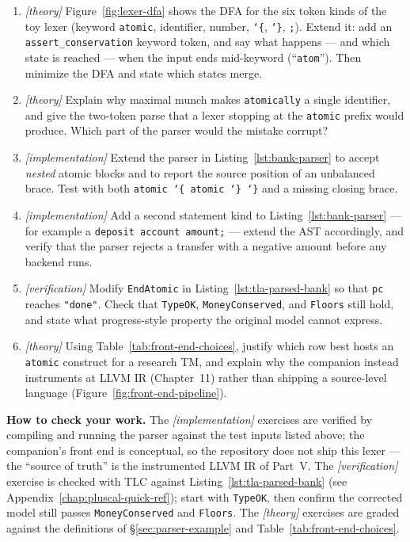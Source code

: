 \begin{enumerate}
    \item \emph{[theory]} Figure~\ref{fig:lexer-dfa} shows the DFA for the
          six token kinds of the toy lexer (keyword \texttt{atomic},
          identifier, number, \texttt{\char`\{}, \texttt{\char`\}},
          \texttt{;}).  Extend it: add an \texttt{assert\_conservation}
          keyword token, and say what happens --- and which state is
          reached --- when the input ends mid-keyword (``\texttt{atom}'').
          Then minimize the DFA and state which states merge.
    \item \emph{[theory]} Explain why maximal munch makes
          \texttt{atomically} a single identifier, and give the
          two-token parse that a lexer stopping at the \texttt{atomic}
          prefix would produce.  Which part of the parser would the mistake
          corrupt?
    \item \emph{[implementation]} Extend the parser in
          Listing~\ref{lst:bank-parser} to accept \emph{nested} atomic
          blocks and to report the source position of an unbalanced brace.
          Test with both \texttt{atomic \char`\{ atomic \char`\}
          \char`\}} and a missing closing brace.
    \item \emph{[implementation]} Add a second statement kind to
          Listing~\ref{lst:bank-parser} --- for example a
          \texttt{deposit account amount;} --- extend the AST accordingly,
          and verify that the parser rejects a transfer with a negative
          amount before any backend runs.
    \item \emph{[verification]} Modify \texttt{EndAtomic} in
          Listing~\ref{lst:tla-parsed-bank} so that \texttt{pc} reaches
          \texttt{"done"}.  Check that \texttt{TypeOK},
          \texttt{MoneyConserved}, and \texttt{Floors} still hold, and
          state what progress-style property the original model cannot
          express.
    \item \emph{[theory]} Using Table~\ref{tab:front-end-choices}, justify
          which row best hosts an \texttt{atomic} construct for a research
          TM, and explain why the companion instead instruments at LLVM IR
          (Chapter~11) rather than shipping a source-level language
          (Figure~\ref{fig:front-end-pipeline}).
\end{enumerate}

\textbf{How to check your work.} The \emph{[implementation]} exercises are
verified by compiling and running the parser against the test inputs listed
above; the companion's front end is conceptual, so the repository does not
ship this lexer --- the ``source of truth'' is the instrumented LLVM IR of
Part~V.  The \emph{[verification]} exercise is checked with TLC against
Listing~\ref{lst:tla-parsed-bank} (see
Appendix~\ref{chap:pluscal-quick-ref});
start with \texttt{TypeOK}, then confirm the corrected model still passes
\texttt{MoneyConserved} and \texttt{Floors}.  The \emph{[theory]}
exercises are graded against the definitions of
\S\ref{sec:parser-example} and Table~\ref{tab:front-end-choices}.
